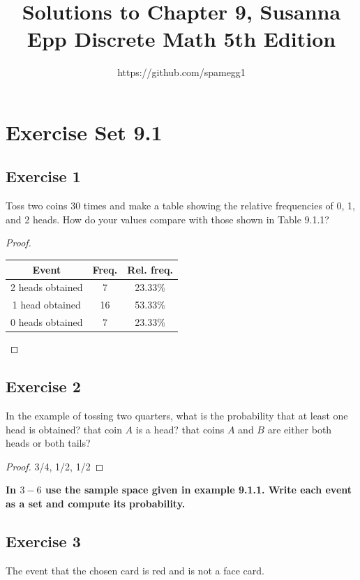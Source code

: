 \documentclass[14pt]{extarticle}
\title{Solutions to Chapter 9, Susanna Epp Discrete Math 5th Edition}
\author{https://github.com/spamegg1}
\newcommand{\cy}{\color{cyan}}
\begin{document}
\maketitle
\tableofcontents

\section{Exercise Set 9.1}

\subsection{Exercise 1}
Toss two coins 30 times and make a table showing the relative frequencies of 0, 1, and 2 heads. How do your 
values compare with those shown in Table 9.1.1?

\begin{proof}
\begin{center}
\begin{tabular}{|c|c|c|}
\hline
{\bf\cy Event} & {\bf\cy Freq.} & {\bf\cy Rel. freq.} \\
\hline
2 heads obtained & 7 & 23.33\% \\
\hline
1 head obtained & 16 & 53.33\% \\
\hline
0 heads obtained & 7 & 23.33\% \\
\hline
\end{tabular}
\end{center}
\end{proof}

\subsection{Exercise 2}
In the example of tossing two quarters, what is the probability that at least one head is obtained? that coin 
$A$ is a head? that coins $A$ and $B$ are either both
heads or both tails?

\begin{proof}
3/4, 1/2, 1/2
\end{proof}

{\bf \cy In $3-6$ use the sample space given in example 9.1.1. Write each event as a set and compute its 
probability.}

\subsection{Exercise 3}
The event that the chosen card is red and is not a face card.
\end{document}
